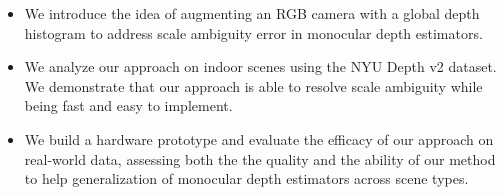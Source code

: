 \begin{itemize}
	\item We introduce the idea of augmenting an RGB camera with a global depth 
    histogram to address scale ambiguity error in monocular depth estimators.	
  \item We analyze our approach on indoor scenes using the NYU Depth v2 dataset.
    We demonstrate that our approach is able to resolve scale ambiguity while
    being fast and easy to implement.
	\item We build a hardware prototype and evaluate the efficacy of our
    approach on real-world data, assessing both the the quality and the ability of our method
    to help generalization of monocular depth estimators across scene types. 
\end{itemize}


